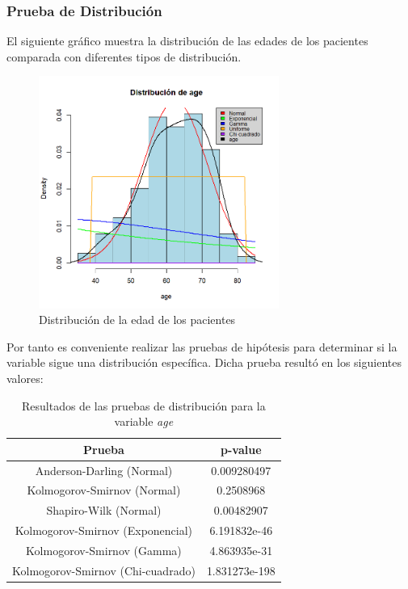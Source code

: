 \documentclass[a4paper,12pt]{article}
\begin{document}
    \subsubsection*{Prueba de Distribución}

    El siguiente gráfico muestra la distribución de las edades de los pacientes comparada con diferentes tipos de distribución.

 \begin{figure}[h]
 	\centering
 	\includegraphics[width=0.7\textwidth]{distribucion_age.png}
 	\caption{Distribución de la edad de los pacientes}
 	\label{fig:age_distribution}
 \end{figure}

Por tanto es conveniente realizar las pruebas de hipótesis para determinar si la variable
sigue una distribución específica. Dicha prueba resultó en los siguientes valores:

\begin{table}[h!]
    \centering
    \begin{tabular}{|c|c|}
        \hline
        \textbf{Prueba} & \textbf{p-value} \\
        \hline
        Anderson-Darling (Normal) & 0.009280497 \\
        \hline
        Kolmogorov-Smirnov (Normal) & 0.2508968 \\
        \hline
        Shapiro-Wilk (Normal) & 0.00482907 \\
        \hline
        Kolmogorov-Smirnov (Exponencial) & 6.191832e-46 \\
        \hline
        Kolmogorov-Smirnov (Gamma) & 4.863935e-31 \\
        \hline
        Kolmogorov-Smirnov (Chi-cuadrado) & 1.831273e-198 \\
        \hline
    \end{tabular}
    \caption{Resultados de las pruebas de distribución para la variable \textit{age}}
    \label{tab:pruebas_distribucion_age}
\end{table}
\end{document}
